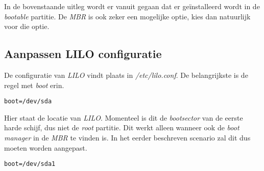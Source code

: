 In de bovenstaande uitleg wordt er vanuit gegaan dat er ge\"{i}nstalleerd wordt in de \emph{bootable} partitie. De \emph{MBR} is ook zeker een mogelijke optie, kies dan natuurlijk voor die optie. 

\subsection{Aanpassen LILO configuratie}
De configuratie van \emph{LILO} vindt plaats in \emph{/etc/lilo.conf}. De belangrijkste is de regel met \emph{boot} erin. 
\begin{lstlisting}
boot=/dev/sda
\end{lstlisting}
Hier staat de locatie van \emph{LILO}. Momenteel is dit de \emph{bootsector} van de eerste harde schijf, dus niet de \emph{root} partitie. Dit werkt alleen wanneer ook de \emph{boot manager} in de \emph{MBR} te vinden is. 
In het eerder beschreven scenario zal dit dus moeten worden aangepast. 
\begin{lstlisting}
boot=/dev/sda1
\end{lstlisting}
